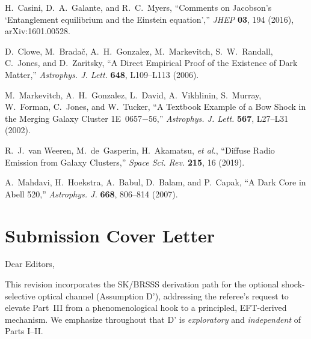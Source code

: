 \documentclass[aps,prd,onecolumn,superscriptaddress,nofootinbib]{revtex4-2}
\begin{document}
\begin{thebibliography}{99}
H.~Casini, D.~A.~Galante, and R.~C.~Myers,
``Comments on Jacobson's `Entanglement equilibrium and the Einstein equation',''
\emph{JHEP} \textbf{03}, 194 (2016), arXiv:1601.00528.

D.~Clowe, M.~Brada\v{c}, A.~H.~Gonzalez, M.~Markevitch, S.~W.~Randall, C.~Jones, and D.~Zaritsky,
``A Direct Empirical Proof of the Existence of Dark Matter,''
\emph{Astrophys. J. Lett.} \textbf{648}, L109–L113 (2006).

M.~Markevitch, A.~H.~Gonzalez, L.~David, A.~Vikhlinin, S.~Murray, W.~Forman, C.~Jones, and W.~Tucker,
``A Textbook Example of a Bow Shock in the Merging Galaxy Cluster 1E~0657$-$56,''
\emph{Astrophys. J. Lett.} \textbf{567}, L27–L31 (2002).

R.~J.~van Weeren, M.~de~Gasperin, H.~Akamatsu, \emph{et al.},
``Diffuse Radio Emission from Galaxy Clusters,''
\emph{Space Sci. Rev.} \textbf{215}, 16 (2019).

A.~Mahdavi, H.~Hoekstra, A.~Babul, D.~Balam, and P.~Capak,
``A Dark Core in Abell 520,''
\emph{Astrophys. J.} \textbf{668}, 806–814 (2007).

\end{thebibliography}

\iffalse
\section*{Submission Cover Letter}
Dear Editors,

This revision incorporates the SK/BRSSS derivation path for the optional shock-selective optical channel (Assumption D$’$), addressing the referee’s request to elevate Part~III from a phenomenological hook to a principled, EFT-derived mechanism. We emphasize throughout that D$’$ is \emph{exploratory} and \emph{independent} of Parts I–II.
\end{document}
